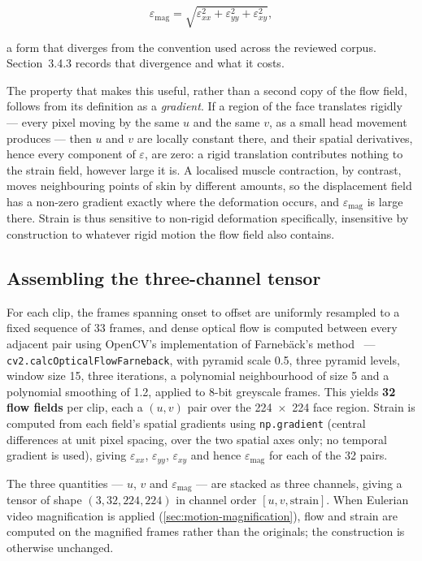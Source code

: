 \[
	\varepsilon_{\text{mag}} = \sqrt{\varepsilon_{xx}^{2} + \varepsilon_{yy}^{2} + \varepsilon_{xy}^{2}},
\]

a form that diverges from the convention used across the reviewed corpus. Section~3.4.3 records that divergence and what it costs.

The property that makes this useful, rather than a second copy of the flow field, follows from its definition as a \textit{gradient}. If a region of the face translates rigidly --- every pixel moving by the same $u$ and the same $v$, as a small head movement produces --- then $u$ and $v$ are locally constant there, and their spatial derivatives, hence every component of $\varepsilon$, are zero: a rigid translation contributes nothing to the strain field, however large it is. A localised muscle contraction, by contrast, moves neighbouring points of skin by different amounts, so the displacement field has a non-zero gradient exactly where the deformation occurs, and $\varepsilon_{\text{mag}}$ is large there. Strain is thus sensitive to non-rigid deformation specifically, insensitive by construction to whatever rigid motion the flow field also contains.

\subsection{Assembling the three-channel tensor}
\label{sec:three-channel-tensor}

For each clip, the frames spanning onset to offset are uniformly resampled to a fixed sequence of 33 frames, and dense optical flow is computed between every adjacent pair using OpenCV's implementation of Farneb\"ack's method~\cite{zhaoS2021} --- \texttt{cv2.calcOpticalFlowFarneback}, with pyramid scale 0.5, three pyramid levels, window size 15, three iterations, a polynomial neighbourhood of size 5 and a polynomial smoothing of 1.2, applied to 8-bit greyscale frames. This yields \textbf{32 flow fields} per clip, each a $(u, v)$ pair over the 224~$\times$~224 face region. Strain is computed from each field's spatial gradients using \texttt{np.gradient} (central differences at unit pixel spacing, over the two spatial axes only; no temporal gradient is used), giving $\varepsilon_{xx}$, $\varepsilon_{yy}$, $\varepsilon_{xy}$ and hence $\varepsilon_{\text{mag}}$ for each of the 32 pairs.

The three quantities --- $u$, $v$ and $\varepsilon_{\text{mag}}$ --- are stacked as three channels, giving a tensor of shape $(3, 32, 224, 224)$ in channel order $[u, v, \text{strain}]$. When Eulerian video magnification is applied (\autoref{sec:motion-magnification}), flow and strain are computed on the magnified frames rather than the originals; the construction is otherwise unchanged.

